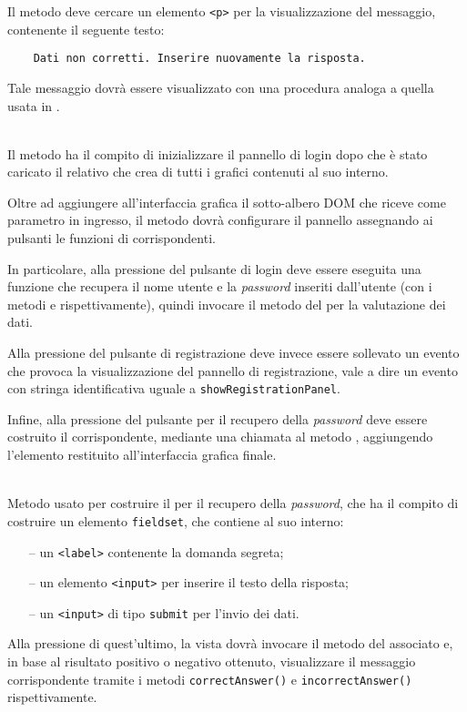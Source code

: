 \begin{description}
	Il metodo deve cercare un elemento \verb'<p>' per la visualizzazione del messaggio, contenente il seguente testo:
\begin{verbatim}
	Dati non corretti. Inserire nuovamente la risposta.
\end{verbatim}
	
	Tale messaggio dovrà essere visualizzato con una procedura analoga a quella usata in .

	\item{}\\
	Il metodo ha il compito di inizializzare il pannello di login dopo che è stato caricato il relativo  che crea di tutti i  grafici contenuti al suo interno.
	
	Oltre ad aggiungere all'interfaccia grafica il sotto-albero DOM che riceve come parametro in ingresso, il metodo dovrà configurare il pannello assegnando ai pulsanti le funzioni di  corrispondenti.
	
	In particolare, alla pressione del pulsante di login deve essere eseguita una funzione che recupera il nome utente e la \textit{password} inseriti dall'utente (con i metodi  e  rispettivamente), quindi invocare il metodo  del  per la valutazione dei dati.
	
	Alla pressione del pulsante di registrazione deve invece essere sollevato un evento che provoca la visualizzazione del pannello di registrazione, vale a dire un evento con stringa identificativa uguale a \verb'showRegistrationPanel'.
	
	Infine, alla pressione del pulsante per il recupero della \textit{password} deve essere costruito il  corrispondente, mediante una chiamata al metodo , aggiungendo l'elemento restituito all'interfaccia grafica finale.
	
	\item{}\\
	Metodo usato per costruire il  per il recupero della \textit{password}, che ha il compito di costruire un elemento \verb'fieldset', che contiene al suo interno:
	\begin{itemize}
	  \item[--] un \verb'<label>' contenente la domanda segreta;
	  \item[--] un elemento \verb'<input>' per inserire il testo della risposta;
	  \item[--] un \verb'<input>' di tipo \verb'submit' per l'invio dei dati.
	\end{itemize}
Alla pressione di quest'ultimo, la vista dovrà invocare il metodo  del  associato e, in base al risultato positivo o negativo ottenuto, visualizzare il messaggio corrispondente tramite i metodi \verb'correctAnswer()' e \verb'incorrectAnswer()' rispettivamente.


\end{description}
